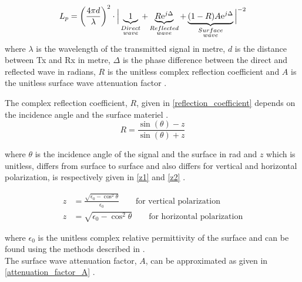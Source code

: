 \begin{equation}
L_p=\left(\frac{4 \pi d}{\lambda}\right)^2 \cdot \Big|\underbrace{1}_{\begin{subarray}{c}Direct\\wave\end{subarray}}+\underbrace{R\text{e}^{j\Delta}}_{\begin{subarray}{c}Reflected\\wave\end{subarray}}+\underbrace{(1-R)A\text{e}^{j\Delta}}_{\begin{subarray}{c}Surface\\wave\end{subarray}}\Big|^{-2} 
\label{ground_wave}
\end{equation}
where
$\lambda$ is the wavelength of the transmitted signal in metre, $d$ is the distance between Tx and Rx in metre, $\Delta$ is the phase difference between the direct and reflected wave in radians, $R$ is the unitless complex reflection coefficient and $A$ is the unitless surface wave attenuation factor \cite{Chong,Bullington}. 


The complex reflection coefficient, $R$, given in \eqref{reflection_coefficient} depends on the incidence angle and the surface materiel \cite{Bullington}.
\begin{equation}
R = \frac{\sin(\theta)-z}{\sin(\theta)+z}
\label{reflection_coefficient}
\end{equation}

where $\theta$ is the incidence angle of the signal and the surface in rad and $z$ which is unitless, differs from surface to surface and also differs for vertical and horizontal polarization, is respectively given in \eqref{z1} and \eqref{z2} .

\begin{align}
z &= \frac{\sqrt{\epsilon_{0}-\cos^{2}\theta}}{\epsilon_{0}} \qquad \text{for vertical polarization} \label{z1}\\
z &= \sqrt{\epsilon_{0}-\cos^{2}\theta}  \qquad \text{for horizontal polarization}
\label{z2}
\end{align}

where $\epsilon_{0}$ is the unitless complex relative permittivity of the surface and can be found using the methods described in \cite{Kim}.\\
The surface wave attenuation factor, $A$, can be approximated as given in \eqref{attenuation_factor_A} \cite{Chong, Bullington}. 


